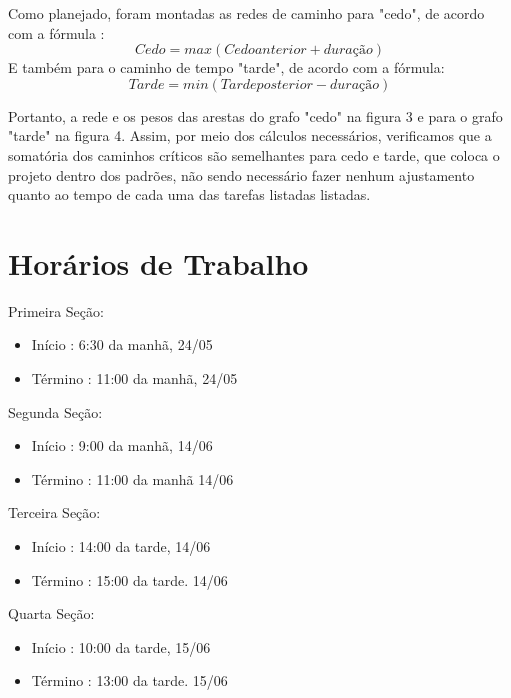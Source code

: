 \documentclass[12pt,a4paper,final]{article}
\begin{document}
Como planejado, foram montadas as redes de caminho para "cedo", de acordo com a fórmula :
\begin{equation}
Cedo = max(Cedo anterior + duração)
\end{equation}
E também para o caminho de tempo "tarde", de acordo com a fórmula:
\begin{equation}
Tarde = min(Tarde posterior - duração)
\end{equation}

Portanto, a rede e os pesos das arestas do grafo "cedo" na figura 3 e para o grafo "tarde" na figura 4.
Assim, por meio dos cálculos necessários, verificamos que a somatória dos caminhos críticos são semelhantes para cedo e tarde, que coloca o projeto dentro dos padrões, não sendo necessário fazer nenhum ajustamento quanto ao tempo de cada uma das tarefas listadas listadas.

\section{Horários de Trabalho}
Primeira Seção:
\begin{itemize}
\item Início : 6:30 da manhã, 24/05
\item Término : 11:00 da manhã, 24/05
\end{itemize}
Segunda Seção:
\begin{itemize}
\item Início : 9:00 da manhã, 14/06
\item Término : 11:00 da manhã 14/06
\end{itemize}
Terceira Seção:
\begin{itemize}
\item Início : 14:00 da tarde, 14/06
\item Término : 15:00 da tarde. 14/06
\end{itemize}
Quarta Seção:
\begin{itemize}
\item Início : 10:00 da tarde, 15/06
\item Término : 13:00 da tarde. 15/06
\end{itemize}
\end{document}
